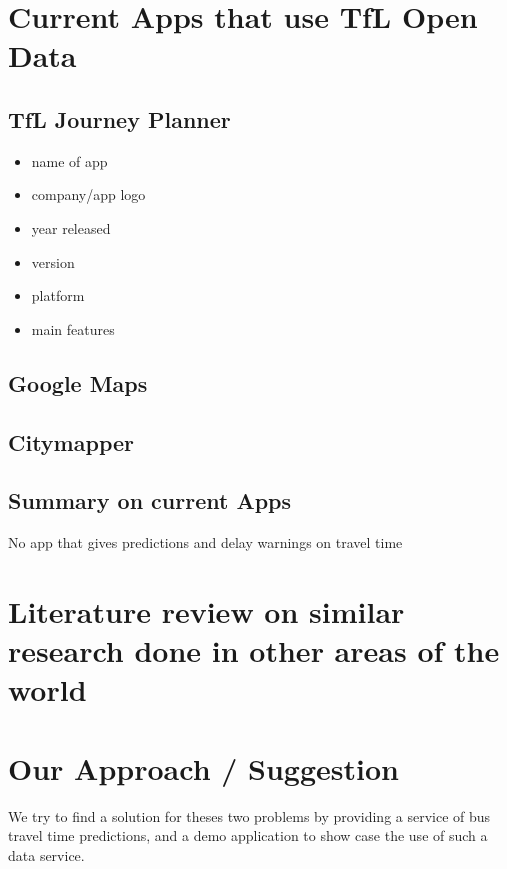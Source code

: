 \section{Current Apps that use TfL Open Data}

\subsection{TfL Journey Planner}

\begin{itemize}
  \item name of app
  \item company/app logo
  \item year released
  \item version
  \item platform
  \item main features
\end{itemize}

\subsection{Google Maps}

\subsection{Citymapper}

\subsection{Summary on current Apps}
No app that gives predictions and delay warnings on travel time

\section{
Literature review on similar research done in other areas of the world}


\section{Our Approach / Suggestion}
We try to find a solution for theses two problems by providing a service of bus travel time predictions, and a demo application to show case the use of such a data service.




